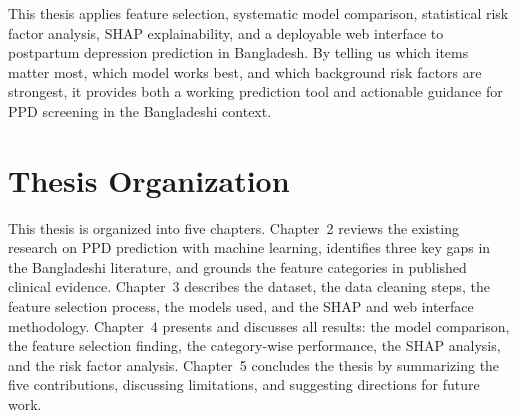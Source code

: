 This thesis applies feature selection, systematic model comparison, statistical risk factor analysis, SHAP explainability, and a deployable web interface to postpartum depression prediction in Bangladesh. By telling us which items matter most, which model works best, and which background risk factors are strongest, it provides both a working prediction tool and actionable guidance for PPD screening in the Bangladeshi context.

\section{Thesis Organization}

This thesis is organized into five chapters. Chapter~2 reviews the existing research on PPD prediction with machine learning, identifies three key gaps in the Bangladeshi literature, and grounds the feature categories in published clinical evidence. Chapter~3 describes the dataset, the data cleaning steps, the feature selection process, the models used, and the SHAP and web interface methodology. Chapter~4 presents and discusses all results: the model comparison, the feature selection finding, the category-wise performance, the SHAP analysis, and the risk factor analysis. Chapter~5 concludes the thesis by summarizing the five contributions, discussing limitations, and suggesting directions for future work.
